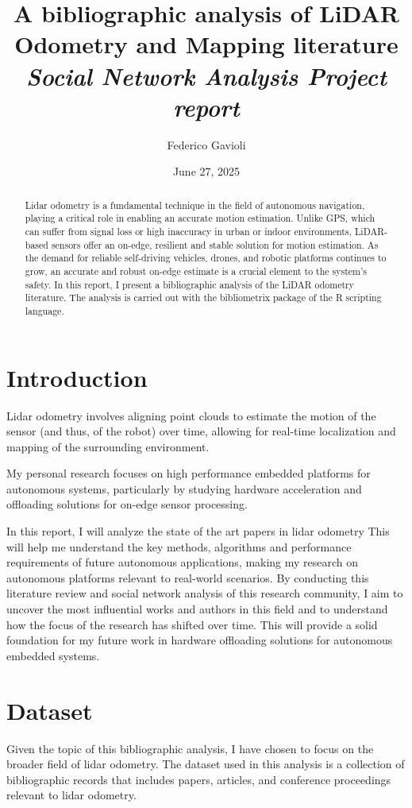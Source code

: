 \documentclass{article}
\title{\textbf{A bibliographic analysis of LiDAR Odometry and Mapping literature} \\ \textit{\normalsize{Social Network Analysis Project report}}}
\author{Federico Gavioli}
\affil{\textit{federico.gavioli@unimore.it}}
\date{June 27, 2025}
\begin{document}
\maketitle

\begin{abstract}
Lidar odometry is a fundamental technique in the field of autonomous navigation, playing a critical role in enabling an accurate motion estimation. Unlike GPS, which can suffer from signal loss or high inaccuracy in urban or indoor environments, LiDAR-based sensors offer an on-edge, resilient and stable solution for motion estimation. As the demand for reliable self-driving vehicles, drones, and robotic platforms continues to grow, an accurate and robust on-edge estimate is a crucial element to the system's safety. In this report, I present a bibliographic analysis of the LiDAR odometry literature. The analysis is carried out with the bibliometrix package of the R scripting language.
\end{abstract}

\section{Introduction}
Lidar odometry involves aligning point clouds to estimate the motion of the sensor (and thus, of the robot) over time, allowing for real-time localization and mapping of the surrounding environment.

My personal research focuses on high performance embedded platforms for autonomous systems, particularly by studying hardware acceleration and offloading solutions for on-edge sensor processing.

In this report, I will analyze the state of the art papers in lidar odometry This will help me understand the key methods, algorithms and performance requirements of future autonomous applications, making my research on autonomous platforms relevant to real-world scenarios. By conducting this literature review and social network analysis of this research community, I aim to uncover the most influential works and authors in this field and to understand how the focus of the research has shifted over time. This will provide a solid foundation for my future work in hardware offloading solutions for autonomous embedded systems.

\section{Dataset}
Given the topic of this bibliographic analysis, I have chosen to focus on the broader field of lidar odometry. The dataset used in this analysis is a collection of bibliographic records that includes papers, articles, and conference proceedings relevant to lidar odometry.
\end{document}
